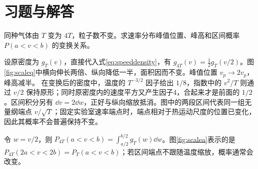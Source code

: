 \section{习题与解答}
\begin{exercise}[两种温度下的曲线缩放]
同种气体由 $T$ 变为 $4T$，粒子数不变。求速率分布峰值位置、峰高和区间概率 $P(a<v<b)$ 的变换关系。
\end{exercise}
\begin{solution}
设原密度为 $g_T(v)$，直接代入式\eqref{eq:speeddensity}，有 $g_{4T}(v)=\tfrac12g_T(v/2)$。图\ref{fig:scaleq}中横向伸长两倍、纵向降低一半，面积因而不变。峰值位置 $v_p\to2v_p$，峰高减半。
在变换后的密度中，温度的 $T^{-3/2}$ 因子给出 $1/8$，指数中的 $v^2/T$ 则通过 $v/2$ 保持原形；同时原密度内的速度平方又产生因子4，合起来才是前面的 $1/2$。区间积分另有 $\dd v=2\dd w$，正好与纵向缩放抵消。图中的两段区间代表同一组无量纲端点 $v/\sqrt T$；固定实验室速率端点时，端点相对于热运动尺度的位置已变化，因此其概率不会普遍保持不变。

令 $w=v/2$，则 $P_{4T}(a<v<b)=\int_{a/2}^{b/2}g_T(w)\dd w$。图\ref{fig:scalea}表示的是 $P_{4T}(2a<v<2b)=P_T(a<v<b)$；若区间端点不跟随温度缩放，概率通常会改变。
\end{solution}

